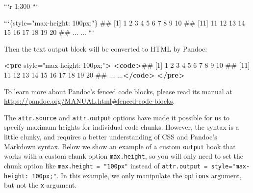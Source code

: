 \documentclass[
  11pt,
]{krantz}
\newenvironment{Shaded}{\begin{snugshade}}{\end{snugshade}}
\newcommand{\BaseNTok}[1]{\textcolor[rgb]{0.06,0.06,0.06}{#1}}
\newcommand{\KeywordTok}[1]{\textcolor[rgb]{0.27,0.27,0.27}{\textbf{#1}}}
\newcommand{\NormalTok}[1]{#1}
\newcommand{\OtherTok}[1]{\textcolor[rgb]{0.37,0.37,0.37}{#1}}
\newcommand{\StringTok}[1]{\textcolor[rgb]{0.5,0.5,0.5}{#1}}
\begin{document}
\begin{Shaded}
\begin{Highlighting}[]
\BaseNTok{```r}
\BaseNTok{1:300}
\BaseNTok{```}

\BaseNTok{```\{style="max-height: 100px;"\}}
\BaseNTok{##   [1]   1   2   3   4   5   6   7   8   9  10}
\BaseNTok{##  [11]  11  12  13  14  15  16  17  18  19  20}
\BaseNTok{##  ... ...}
\BaseNTok{```}
\end{Highlighting}
\end{Shaded}

Then the text output block will be converted to HTML by Pandoc:

\begin{Shaded}
\begin{Highlighting}[]
\KeywordTok{<pre}\OtherTok{ style=}\StringTok{"max-height: 100px;"}\KeywordTok{>}
\KeywordTok{<code>}\NormalTok{##   [1]   1   2   3   4   5   6   7   8   9  10}
\NormalTok{##  [11]  11  12  13  14  15  16  17  18  19  20}
\NormalTok{##  ... ...}\KeywordTok{</code>}
\KeywordTok{</pre>}
\end{Highlighting}
\end{Shaded}

To learn more about Pandoc's fenced code blocks, please read its manual at \url{https://pandoc.org/MANUAL.html\#fenced-code-blocks}.

The \texttt{attr.source} and \texttt{attr.output} options have made it possible for us to specify maximum heights for individual code chunks. However, the syntax is a little clunky, and requires a better understanding of CSS and Pandoc's Markdown syntax. Below we show an example of a custom \texttt{output} hook that works with a custom chunk option \texttt{max.height}, so you will only need to set the chunk option like \texttt{max.height\ =\ "100px"} instead of \texttt{attr.output\ =\ \textquotesingle{}style="max-height:\ 100px;"\textquotesingle{}}. In this example, we only manipulate the \texttt{options} argument, but not the \texttt{x} argument.
\end{document}

